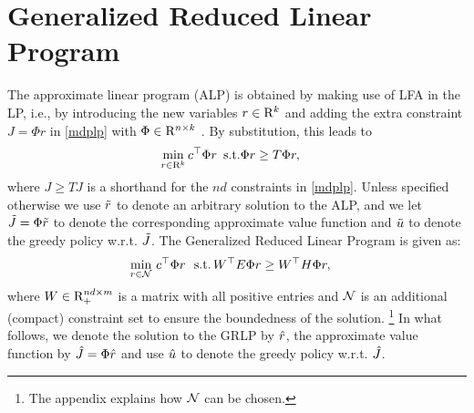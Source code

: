 \section{Generalized Reduced Linear Program}
The approximate linear program (ALP) is obtained by making use of LFA in the LP, i.e., by introducing the new variables $r\in \mathrm{R}^k$ and adding the extra constraint $J=\Phi r$ in \eqref{mdplp} with $\Phi \in \mathrm{R}^{n\times k}$ \citep{SchSei85}. 
By substitution, this leads to
\begin{align}\label{alp}
\begin{split}
\min_{r\in \R^k}\, &c^\top \Phi r\,\,\,
\text{s.t.}\mb \Phi r\geq T \Phi r,
\end{split}
\end{align}
where $J\geq TJ$ is a shorthand for the $nd$ constraints in \eqref{mdplp}. Unless specified otherwise we use $\tilde{r}$ to denote an arbitrary solution to the ALP, and we let $\tilde{J}=\Phi \tilde{r}$ to denote the corresponding approximate value function and $\tilde{u}$ to denote the greedy policy w.r.t. $\tilde{J}$.
The Generalized Reduced Linear Program is given as:
\begin{align}\label{grlp}
\begin{split}
\underset{r\in \N}{\min}\, &\, c^\top \Phi r\,\,\,\,
\text{s.t.}\mb  \,W^\top E\Phi r\geq W^\top H \Phi r,
\end{split}
\end{align}
where $W \in \mathrm{R}^{nd\times m}_+$ is a matrix with all positive entries and $\mathcal{N}$ is an additional (compact) constraint set to ensure the boundedness of the solution.%
\footnote{The appendix explains how $\mathcal{N}$ can be chosen.}
In what follows, we denote the solution to the GRLP by $\hat{r}$, the approximate value function by $\hat{J}=\Phi \hat{r}$ and use $\hat{u}$ to denote the greedy policy w.r.t. $\hat{J}$.

